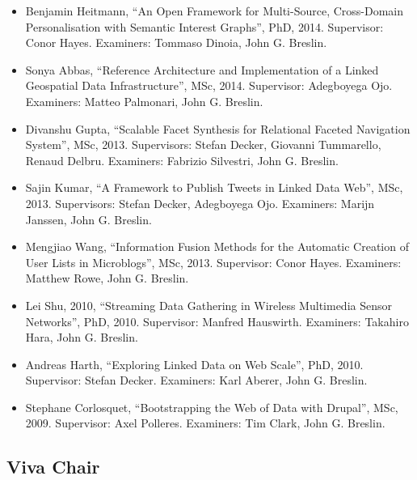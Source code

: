 \documentclass[10pt,a4paper]{res} %
\begin{document}
\begin{resume}
\begin{itemize}
\item Benjamin Heitmann, ``An Open Framework for Multi-Source, Cross-Domain Personalisation with Semantic Interest Graphs'', PhD, 2014. Supervisor: Conor Hayes. Examiners: Tommaso Dinoia, John G. Breslin.
\item Sonya Abbas, ``Reference Architecture and Implementation of a Linked Geospatial Data Infrastructure'', MSc, 2014. Supervisor: Adegboyega Ojo. Examiners: Matteo Palmonari, John G. Breslin.
\item Divanshu Gupta, ``Scalable Facet Synthesis for Relational Faceted Navigation System'', MSc, 2013. Supervisors: Stefan Decker, Giovanni Tummarello, Renaud Delbru. Examiners: Fabrizio Silvestri, John G. Breslin.
\item Sajin Kumar, ``A Framework to Publish Tweets in Linked Data Web'', MSc, 2013. Supervisors: Stefan Decker, Adegboyega Ojo. Examiners: Marijn Janssen, John G. Breslin.
\item Mengjiao Wang, ``Information Fusion Methods for the Automatic Creation of User Lists in Microblogs'', MSc, 2013. Supervisor: Conor Hayes. Examiners: Matthew Rowe, John G. Breslin.
\item Lei Shu, 2010, ``Streaming Data Gathering in Wireless Multimedia Sensor Networks'', PhD, 2010. Supervisor: Manfred Hauswirth. Examiners: Takahiro Hara, John G. Breslin.
\item Andreas Harth, ``Exploring Linked Data on Web Scale'', PhD, 2010. Supervisor: Stefan Decker. Examiners: Karl Aberer, John G. Breslin.
\item Stephane Corlosquet, ``Bootstrapping the Web of Data with Drupal'', MSc, 2009. Supervisor: Axel Polleres. Examiners: Tim Clark, John G. Breslin.
\end{itemize}

\subsection*{Viva Chair}


\end{resume}
\end{document}
